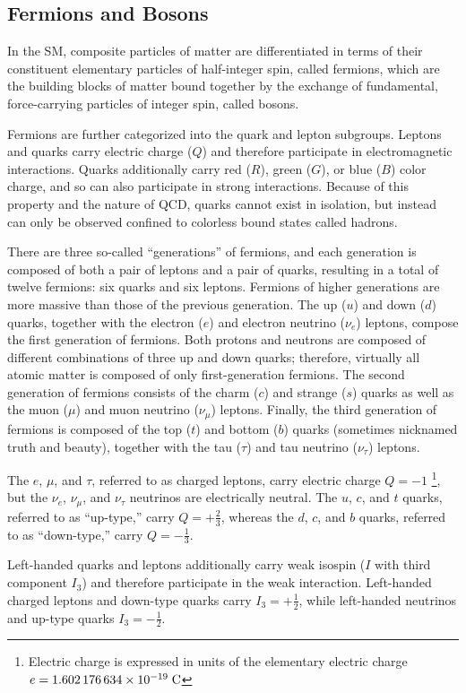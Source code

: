 \subsection{Fermions and Bosons}
In the SM, composite particles of matter are differentiated in terms of their constituent elementary particles of half-integer spin, called fermions, which are the building blocks of matter bound together by the exchange of fundamental, force-carrying particles of integer spin, called bosons. 

Fermions are further categorized into the quark and lepton subgroups.
Leptons and quarks carry electric charge ($Q$) and therefore participate in electromagnetic interactions.
Quarks additionally carry red ($R$), green ($G$), or blue ($B$) color charge, and so can also participate in strong interactions.
Because of this property and the nature of QCD, quarks cannot exist in isolation, but instead can only be observed confined to colorless bound states called hadrons.

There are three so-called ``generations'' of fermions, and each generation is composed of both a pair of leptons and a pair of quarks, resulting in a total of twelve fermions: six quarks and six leptons.
Fermions of higher generations are more massive than those of the previous generation.
The up ($u$) and down ($d$) quarks, together with the electron ($e$) and electron neutrino ($\nu_e$) leptons, compose the first generation of fermions.
Both protons and neutrons are composed of different combinations of three up and down quarks; therefore, virtually all atomic matter is composed of only first-generation fermions.
The second generation of fermions consists of the charm ($c$) and strange ($s$) quarks as well as the muon ($\mu$) and muon neutrino ($\nu_\mu$) leptons.
Finally, the third generation of fermions is composed of the top ($t$) and bottom ($b$) quarks (sometimes nicknamed truth and beauty), together with the tau ($\tau$) and tau neutrino ($\nu_\tau$) leptons.

The $e$, $\mu$, and $\tau$, referred to as charged leptons, carry electric charge $Q = -1$ \footnote{Electric charge is expressed in units of the elementary electric charge $e = \num{1.602176634e-19} \; \si{\C}$}, but the $\nu_e$, $\nu_\mu$, and $\nu_\tau$ neutrinos are electrically neutral.
The $u$, $c$, and $t$ quarks, referred to as ``up-type,'' carry $Q = +\frac{2}{3}$, whereas the $d$, $c$, and $b$ quarks, referred to as ``down-type,'' carry $Q = -\frac{1}{3}$.

Left-handed quarks and leptons additionally carry weak isospin ($I$ with third component $I_3$) and therefore participate in the weak interaction.
Left-handed charged leptons and down-type quarks carry $I_3 = +\frac{1}{2}$, while left-handed neutrinos and up-type quarks $I_3 = -\frac{1}{2}$.

